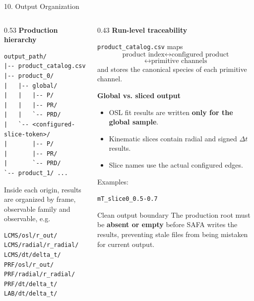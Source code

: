 \documentclass{beamer}
\begin{document}
\begin{frame}[fragile]{10. Output Organization}
\fontsize{6.25}{6.95}\selectfont

\begin{columns}[T]

\begin{column}{0.53\textwidth}
\textbf{Production hierarchy}

\begin{verbatim}
output_path/
|-- product_catalog.csv
|-- product_0/
|   |-- global/
|   |   |-- P/
|   |   |-- PR/
|   |   `-- PRD/
|   `-- <configured-slice-token>/
|       |-- P/
|       |-- PR/
|       `-- PRD/
`-- product_1/ ...
\end{verbatim}

Inside each origin, results are organized by frame, observable family and observable, e.g.

\begin{verbatim}
LCMS/osl/r_out/
LCMS/radial/r_radial/
LCMS/dt/delta_t/
PRF/osl/r_out/
PRF/radial/r_radial/
PRF/dt/delta_t/
LAB/dt/delta_t/
\end{verbatim}
\end{column}

\begin{column}{0.43\textwidth}
\textbf{Run-level traceability}

\texttt{product\_catalog.csv} maps
\[
\boxed{\text{product index}}
\longleftrightarrow
\boxed{\text{configured product}}
\]
\[
\longleftrightarrow
\boxed{\text{primitive channels}}
\]
and stores the canonical species of each primitive channel.

\medskip
\textbf{Global vs. sliced output}
\begin{itemize}
    \setlength{\itemsep}{0.15em}
    \item OSL fit results are written \textbf{only for the global sample}.
    \item Kinematic slices contain radial and signed $\Delta t$ results.
    \item Slice names use the actual configured edges.
\end{itemize}

Examples:\par
\texttt{mT\_slice0\_0.5-0.7}\par
{}

\begin{alertblock}{Clean output boundary}
The production root must be \textbf{absent or empty} before SAFA writes the results, preventing stale files from being mistaken for current output.
\end{alertblock}
\end{column}

\end{columns}
\end{frame}
\end{document}
